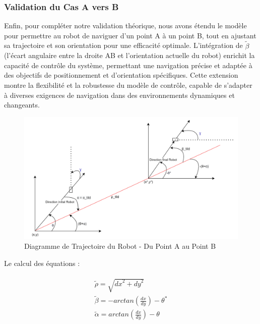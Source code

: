 \subsubsection{Validation du Cas A vers B}


Enfin, pour compléter notre validation théorique, nous avons étendu le modèle pour permettre au robot de naviguer d'un point A à un point B, tout en ajustant sa trajectoire et son orientation pour une efficacité optimale. L'intégration de $\tilde{\beta}$ (l'écart angulaire entre la droite AB et l'orientation actuelle du robot) enrichit la capacité de contrôle du système, permettant une navigation précise et adaptée à des objectifs de positionnement et d'orientation spécifiques. Cette extension montre la flexibilité et la robustesse du modèle de contrôle, capable de s'adapter à diverses exigences de navigation dans des environnements dynamiques et changeants.


\begin{figure}[!h]
    \centering
    \includegraphics[width=1.0\textwidth]{img/diagrams/3schema_transformation2.png} 
    \caption{Diagramme de Trajectoire du Robot - Du Point A au Point B}
    \label{img-abc_dq}
\end{figure}


Le calcul des équations : 

\begin{align*}
\begin{split}
    \tilde{\rho} = \sqrt{{dx}^2 + {dy}^2} \\
    \tilde{\beta} = -arctan\left(\frac{dx}{dy}\right) - \theta^* \\
    \tilde{\alpha} = arctan\left(\frac{dx}{dy}\right) - \theta 
\end{split}
\end{align*}


